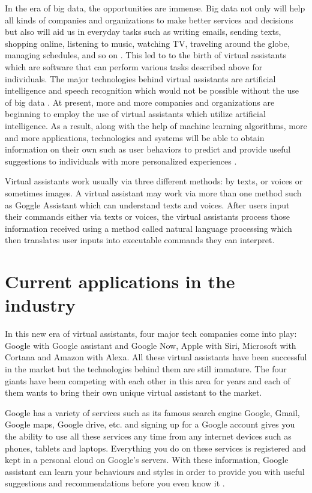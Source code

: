 In the era of big data, the opportunities are immense. Big data not only will help all kinds of companies and organizations to make better services and decisions but also will aid us in everyday tasks such as writing emails, sending texts, shopping online, listening to music, watching TV, traveling around the globe, managing schedules, and so on \cite{Tal2015internet}. This led to to the birth of virtual assistants which are software that can perform various tasks described above for individuals. The major technologies behind virtual assistants are artificial intelligence and speech recognition which would not be possible without the use of big data \cite{Baron2017assistants}. At present, more and more companies and organizations are beginning to employ the use of virtual assistants which utilize artificial intelligence. As a result, along with the help of machine learning algorithms, more and more applications, technologies and systems will be able to obtain information on their own such as user behaviors to predict and provide useful suggestions to individuals with more personalized experiences \cite{Hard2014applications}.

Virtual assistants work usually via three different methods: by texts, or voices or sometimes images. A virtual assistant may work via more than one method such as Goggle Assistant which can understand texts and voices. After users input their commands either via texts or voices, the virtual assistants process those information received using a method called natural language processing which then translates user inputs into executable commands they can interpret. 

\section{Current applications in the industry}

In this new era of virtual assistants, four major tech companies come into play: Google with Google assistant and Google Now, Apple with Siri, Microsoft with Cortana and Amazon with Alexa. All these virtual assistants have been successful in the market but the technologies behind them are still immature. The four giants have been competing with each other in this area for years and each of them wants to bring their own unique virtual assistant to the market. 

Google has a variety of services such as its famous search engine Google, Gmail, Google maps, Google drive, etc. and signing up for a Google account gives you the ability to use all these services any time from any internet devices such as phones, tablets and laptops. Everything you do on these services is registered and kept in a personal cloud on Google's servers. With these information, Google assistant can learn your behaviours and styles in order to provide you with useful suggestions and recommendations before you even know it \cite{Tal2015internet}.



